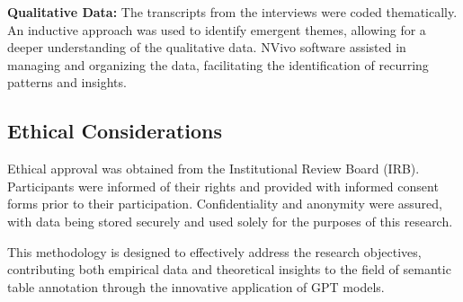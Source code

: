 \documentclass{article}
\begin{document}
\textbf{Qualitative Data:} The transcripts from the interviews were coded thematically. An inductive approach was used to identify emergent themes, allowing for a deeper understanding of the qualitative data. NVivo software assisted in managing and organizing the data, facilitating the identification of recurring patterns and insights.

\subsection{Ethical Considerations}

Ethical approval was obtained from the Institutional Review Board (IRB). Participants were informed of their rights and provided with informed consent forms prior to their participation. Confidentiality and anonymity were assured, with data being stored securely and used solely for the purposes of this research.

This methodology is designed to effectively address the research objectives, contributing both empirical data and theoretical insights to the field of semantic table annotation through the innovative application of GPT models.
\end{document}
